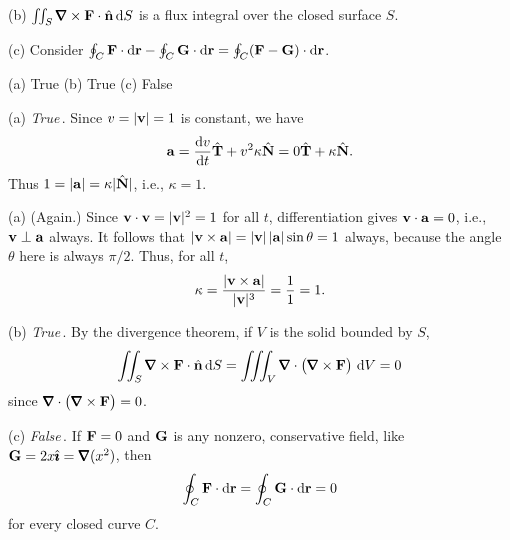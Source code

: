 \begin{hint} 

(b) $\dblInt_{S}\vnabla\times\vF\cdot\hn\,\dee{S}$ is a flux integral
     over the closed surface $S$.

(c) Consider $\oint_C \mathbf{F}\cdot \mathrm{d}\mathbf{r}-\oint_C \mathbf{G}\cdot \mathrm{d}\mathbf{r}
        =\oint_C (\mathbf{F} - \mathbf{G})\cdot \mathrm{d}\mathbf{r}$.
\end{hint}

\begin{answer} 
(a) True\qquad
(b) True\qquad
(c) False
\end{answer}

\begin{solution} 
(a)  \emph{True}$\,$.
Since $v=|\mathbf{v}|=1$ is constant, we have
\begin{equation*}
\va
= \diff{v}{t}\hat\vT + v^2\kappa\hat\vN
= 0\hat\vT + \kappa\hat\vN.
\end{equation*}
Thus $1 = |\mathbf{a}| = \kappa|\hat{\mathbf{N}}|$, i.e., $\kappa=1$.


(a) (Again.)
Since $\mathbf{v}\cdot\mathbf{v}=|\mathbf{v}|^2=1$ for all $t$, differentiation
gives $\mathbf{v}\cdot\mathbf{a}=0$, i.e., $\mathbf{v}\perp\mathbf{a}$ always.  It follows
that $|\mathbf{v}\times\mathbf{a}| = |\mathbf{v}|\,|\mathbf{a}|\sin\theta = 1$
always, because the angle $\theta$ here is always $\pi/2$.  Thus, for all
$t$,
\begin{equation*}
\kappa = { |\mathbf{v}\times\mathbf{a}|\over |\mathbf{v}|^3} = {1\over 1} = 1.
\end{equation*}

(b) \emph{True}$\,$. 
By the divergence theorem, if $V$ is the
solid bounded by $S$, 
\begin{equation*}
\dblInt_{S}\vnabla\times\vF\cdot\hn\,\dee{S}
=\tripInt_V\vnabla\cdot\big(\vnabla\times\vF\big)\ \dee{V}
=0
\end{equation*}
since $\vnabla\cdot\big(\vnabla\times\vF\big)=0$.

(c) \emph{False}$\,$. 
If $\mathbf{F}=0$ and $\mathbf{G}$ is any nonzero,
conservative field, like $\vG=2x\hi=\vnabla(x^2)$, then 
\begin{equation*}
 \oint_C \mathbf{F}\cdot \mathrm{d}\mathbf{r}=\oint_C \mathbf{G}\cdot \mathrm{d}\mathbf{r}=0
\end{equation*}
for every closed curve $C$.
\end{solution}

